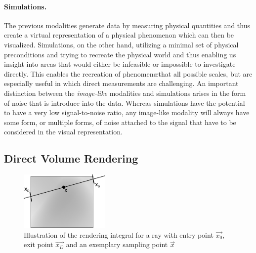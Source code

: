\paragraph{Simulations. }  The previous modalities generate data by measuring physical quantities and thus create a virtual representation of a physical phenomenon which can then be visualized.  Simulations, on the other hand, utilizing a minimal set of physical preconditions and trying to recreate the physical world and thus enabling us insight into areas that would either be infeasible or impossible to investigate directly.  
This enables the recreation of phenomen\ae that all possible scales, but are especially useful in which direct measurements are challenging.  An important distinction between the \emph{image-like} modalities and simulations arises in the form of noise that is introduce into the data.  Whereas simulations have the potential to have a very low signal-to-noise ratio, any image-like modality will always have some form, or multiple forms, of noise attached to the signal that have to be considered in the visual representation.



\subsection{Direct Volume Rendering} \label{cha:intro:vp:dvr}

\begin{figure}
\centering
\includegraphics[width=0.39\textwidth]{figures/intro/rendering_integral.pdf}
\caption{Illustration of the rendering integral for a ray with entry point $\vec{x_0}$, exit point $\vec{x_D}$ and an exemplary sampling point $\vec{x}$}
\label{fig:intro:dvr}
\end{figure}

